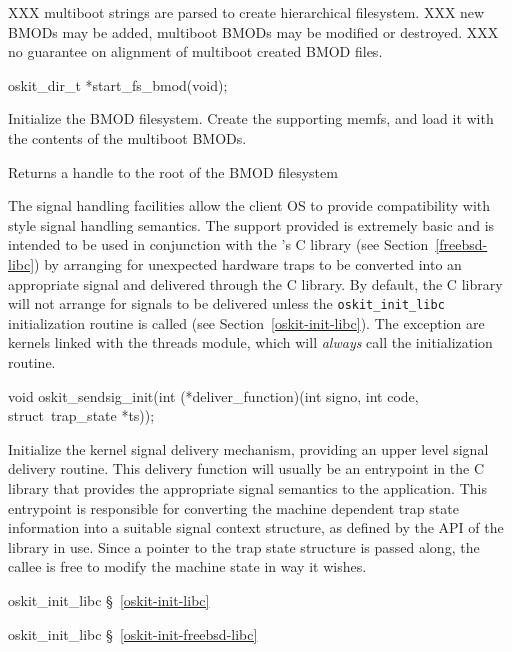 XXX multiboot strings are parsed to create hierarchical filesystem.
XXX new BMODs may be added, multiboot BMODs may be modified or destroyed.
XXX no guarantee on alignment of multiboot created BMOD files.

\begin{apisyn}

	\funcproto oskit_dir_t *start_fs_bmod(void);
\end{apisyn}
\begin{apidesc}
	Initialize the BMOD filesystem.  Create the supporting memfs,
	and load it with the contents of the multiboot BMODs.
\end{apidesc}
\begin{apiret}
	Returns a handle to the root of the BMOD filesystem
\end{apiret}


\label{kern-signals}

The signal handling facilities allow the client OS to provide compatibility
with \posix{} style signal handling semantics. The support provided is
extremely basic and is intended to be used in conjunction with the
\oskit{}'s \freebsd{} C library (see Section~\ref{freebsd-libc}) by arranging
for unexpected hardware traps to be converted into an appropriate signal
and delivered through the C library. By default, the \freebsd{} C library will
not arrange for signals to be delivered unless the {\tt oskit_init_libc}
initialization routine is called (see Section~\ref{oskit-init-libc}).
The exception are kernels linked with the \posix{} threads module, which
will \emph{always} call the initialization routine.

\begin{apisyn}

	\funcproto void oskit_sendsig_init(int
                    (*deliver_function)(int signo, int code,
                                        struct~trap_state *ts));
\end{apisyn}
\begin{apidesc}
	Initialize the kernel signal delivery mechanism, providing an upper
	level signal delivery routine. This delivery function will usually
	be an entrypoint in the C library that provides the appropriate
	signal semantics to the application. This entrypoint is responsible
	for converting the machine dependent trap state information into a
	suitable signal context structure, as defined by the API of the
	library in use. Since a pointer to the trap state structure is
	passed along, the callee is free to modify the machine state in way
	it wishes. 
\end{apidesc}
\begin{apidep}
	\item[oskit_init_libc]	\S~\ref{oskit-init-libc}
	\item[oskit_init_libc]	\S~\ref{oskit-init-freebsd-libc}
\end{apidep}

